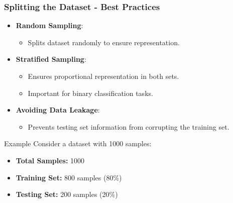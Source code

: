 \documentclass[aspectratio=169]{beamer}
\begin{document}
\begin{frame}[fragile]
  \frametitle{Splitting the Dataset - Best Practices}
  \begin{itemize}
    \item \textbf{Random Sampling}:
      \begin{itemize}
        \item Splits dataset randomly to ensure representation.
      \end{itemize}
      
    \item \textbf{Stratified Sampling}:
      \begin{itemize}
        \item Ensures proportional representation in both sets.
        \item Important for binary classification tasks.
      \end{itemize}
      
    \item \textbf{Avoiding Data Leakage}:
      \begin{itemize}
        \item Prevents testing set information from corrupting the training set.
      \end{itemize}
  \end{itemize}
  
  \begin{block}{Example}
    Consider a dataset with 1000 samples:
    \begin{itemize}
      \item \textbf{Total Samples:} 1000
      \item \textbf{Training Set:} 800 samples (80\%)
      \item \textbf{Testing Set:} 200 samples (20\%)
    \end{itemize}
  \end{block}
\end{frame}
\end{document}
